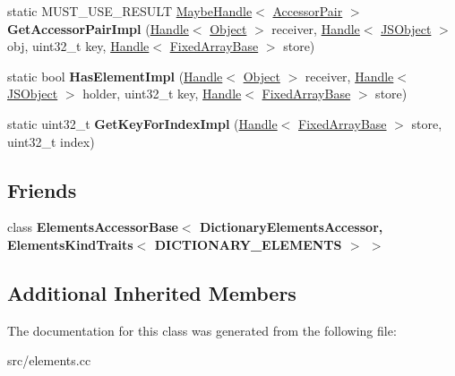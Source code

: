 \begin{DoxyCompactItemize}
\item 
\hypertarget{classv8_1_1internal_1_1_dictionary_elements_accessor_ac4f260607851d7925bca425894ea9f19}{}static M\+U\+S\+T\+\_\+\+U\+S\+E\+\_\+\+R\+E\+S\+U\+L\+T \hyperlink{classv8_1_1internal_1_1_maybe_handle}{Maybe\+Handle}$<$ \hyperlink{classv8_1_1internal_1_1_accessor_pair}{Accessor\+Pair} $>$ {\bfseries Get\+Accessor\+Pair\+Impl} (\hyperlink{classv8_1_1internal_1_1_handle}{Handle}$<$ \hyperlink{classv8_1_1internal_1_1_object}{Object} $>$ receiver, \hyperlink{classv8_1_1internal_1_1_handle}{Handle}$<$ \hyperlink{classv8_1_1internal_1_1_j_s_object}{J\+S\+Object} $>$ obj, uint32\+\_\+t key, \hyperlink{classv8_1_1internal_1_1_handle}{Handle}$<$ \hyperlink{classv8_1_1internal_1_1_fixed_array_base}{Fixed\+Array\+Base} $>$ store)\label{classv8_1_1internal_1_1_dictionary_elements_accessor_ac4f260607851d7925bca425894ea9f19}

\item 
\hypertarget{classv8_1_1internal_1_1_dictionary_elements_accessor_a183aff4dd257ef0f281e3dfd9932623c}{}static bool {\bfseries Has\+Element\+Impl} (\hyperlink{classv8_1_1internal_1_1_handle}{Handle}$<$ \hyperlink{classv8_1_1internal_1_1_object}{Object} $>$ receiver, \hyperlink{classv8_1_1internal_1_1_handle}{Handle}$<$ \hyperlink{classv8_1_1internal_1_1_j_s_object}{J\+S\+Object} $>$ holder, uint32\+\_\+t key, \hyperlink{classv8_1_1internal_1_1_handle}{Handle}$<$ \hyperlink{classv8_1_1internal_1_1_fixed_array_base}{Fixed\+Array\+Base} $>$ store)\label{classv8_1_1internal_1_1_dictionary_elements_accessor_a183aff4dd257ef0f281e3dfd9932623c}

\item 
\hypertarget{classv8_1_1internal_1_1_dictionary_elements_accessor_ab775a84fa5fbff894609c15c6e18edde}{}static uint32\+\_\+t {\bfseries Get\+Key\+For\+Index\+Impl} (\hyperlink{classv8_1_1internal_1_1_handle}{Handle}$<$ \hyperlink{classv8_1_1internal_1_1_fixed_array_base}{Fixed\+Array\+Base} $>$ store, uint32\+\_\+t index)\label{classv8_1_1internal_1_1_dictionary_elements_accessor_ab775a84fa5fbff894609c15c6e18edde}

\end{DoxyCompactItemize}
\subsection*{Friends}
\begin{DoxyCompactItemize}
\item 
\hypertarget{classv8_1_1internal_1_1_dictionary_elements_accessor_aa7f284737539c01b9df5d38517340ba3}{}class {\bfseries Elements\+Accessor\+Base$<$ Dictionary\+Elements\+Accessor, Elements\+Kind\+Traits$<$ D\+I\+C\+T\+I\+O\+N\+A\+R\+Y\+\_\+\+E\+L\+E\+M\+E\+N\+T\+S $>$ $>$}\label{classv8_1_1internal_1_1_dictionary_elements_accessor_aa7f284737539c01b9df5d38517340ba3}

\end{DoxyCompactItemize}
\subsection*{Additional Inherited Members}


The documentation for this class was generated from the following file\+:\begin{DoxyCompactItemize}
\item 
src/elements.\+cc\end{DoxyCompactItemize}
